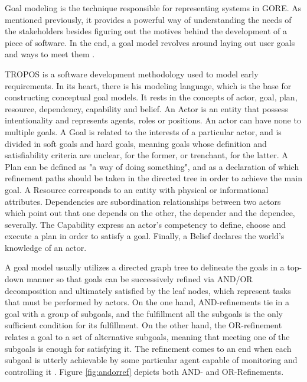 Goal modeling is the technique responsible for representing systems in GORE. As mentioned previously, it provides a powerful way of understanding the needs of the stakeholders besides figuring out the motives behind the development of a piece of software. In the end, a goal model revolves around laying out user goals and ways to meet them \cite{ali_goal_based_2010}. 

TROPOS \cite{bresciani_tropos_2004} is a software development methodology used to model early requirements. In its heart, there is his modeling language, which is the base for constructing conceptual goal models. It rests in the concepts of actor, goal, plan, resource, dependency, capability and belief. An Actor is an entity that possess intentionality and represents agents, roles or positions. An actor can have none to multiple goals. A Goal is related to the interests of a particular actor, and is divided in soft goals and hard goals, meaning goals whose definition and satisfiability criteria are unclear, for the former, or trenchant, for the latter. A Plan can be defined as "a way of doing something", and as a declaration of which refinement paths should be taken in the directed tree in order to achieve the main goal. A Resource corresponds to an entity with physical or informational attributes. Dependencies are subordination relationships between two actors which point out that one depends on the other, the depender and the dependee, severally. The Capability express an actor's competency to define, choose and execute a plan in order to satisfy a goal. Finally, a Belief declares the world's knowledge of an actor.

A goal model usually utilizes a directed graph tree to delineate the goals in a top-down manner so that goals can be successively refined via AND/OR decomposition and ultimately satisfied by the leaf nodes, which represent tasks that must be performed by actors. On the one hand, AND-refinements tie in a goal with a group of subgoals, and the fulfillment all the subgoals is the only sufficient condition for its fulfillment. On the other hand, the OR-refinement relates a goal to a set of alternative subgoals, meaning that meeting one of the subgoals is enough for satisfying it. The refinement comes to an end when each subgoal is utterly achievable by some particular agent capable of monitoring and controlling it \cite{van_lamsweerde_system_2003}. Figure \ref{fig:andorref} depicts both AND- and OR-Refinements.

